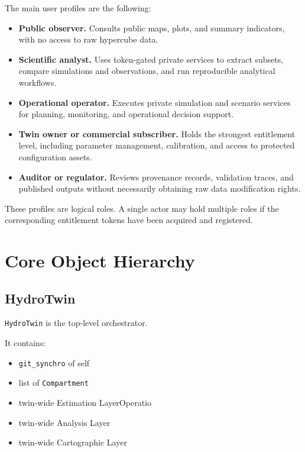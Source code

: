 The main user profiles are the following:

\begin{itemize}
\item \textbf{Public observer.} Consults public maps, plots, and summary indicators, with no access to raw hypercube data.
\item \textbf{Scientific analyst.} Uses token-gated private services to extract subsets, compare simulations and observations, and run reproducible analytical workflows.
\item \textbf{Operational operator.} Executes private simulation and scenario services for planning, monitoring, and operational decision support.
\item \textbf{Twin owner or commercial subscriber.} Holds the strongest entitlement level, including parameter management, calibration, and access to protected configuration assets.
\item \textbf{Auditor or regulator.} Reviews provenance records, validation traces, and published outputs without necessarily obtaining raw data modification rights.
\end{itemize}

These profiles are logical roles. A single actor may hold multiple roles if the corresponding entitlement tokens have been acquired and registered.


\section{Core Object Hierarchy}

\subsection{HydroTwin}

\texttt{HydroTwin} is the top-level orchestrator.

It contains:

\begin{itemize}
\item \texttt{git\_synchro} of self
\item list of \texttt{Compartment}
\item twin-wide Estimation LayerOperatio
\item twin-wide Analysis Layer
\item twin-wide Cartographic Layer
\end{itemize}

